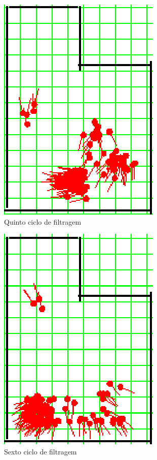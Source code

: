\begin{figure}[H]
  \centering
  \includegraphics[scale=1]{figuras/cen1_ex1/6.eps}
  \caption[Quinto Ciclo de Filtragem]{Quinto ciclo de filtragem}
  \label{img:cen1_ex1_6}
\end{figure}

\begin{figure}[H]
  \centering
  \includegraphics[scale=1]{figuras/cen1_ex1/7.eps}
  \caption[Sexto Ciclo de Filtragem]{Sexto ciclo de filtragem}
  \label{img:cen1_ex1_7}
\end{figure}

